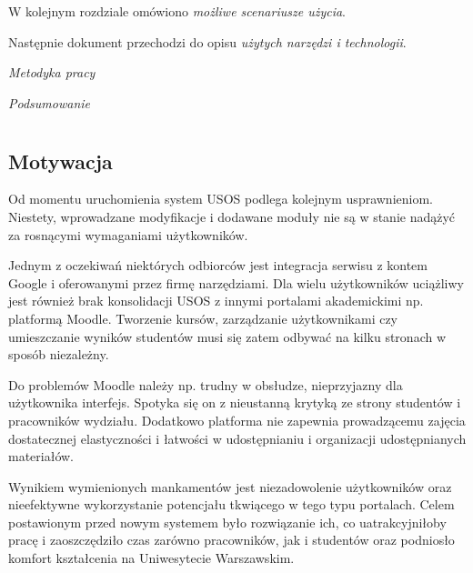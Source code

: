 \documentclass{pracamgr}
\begin{document}
W kolejnym rozdziale omówiono \emph{możliwe scenariusze użycia}. 

Następnie dokument przechodzi do opisu \emph{użytych narzędzi i technologii}. 

\emph{Metodyka pracy} 

\emph{Podsumowanie}

%
%
\chapter{ } %

%
%
\section{Motywacja}

Od momentu uruchomienia system USOS podlega kolejnym usprawnieniom. Niestety, 
wprowadzane modyfikacje i dodawane moduły nie są w stanie nadążyć za rosnącymi 
wymaganiami użytkowników.
 
Jednym z oczekiwań niektórych odbiorców jest integracja serwisu z kontem Google i 
oferowanymi przez firmę narzędziami. Dla wielu użytkowników uciążliwy jest również 
brak konsolidacji USOS z innymi portalami akademickimi np. platformą Moodle. 
Tworzenie kursów, zarządzanie użytkownikami czy umieszczanie wyników studentów
musi się zatem odbywać na kilku stronach w sposób niezależny.

Do problemów Moodle należy np. trudny w obsłudze, nieprzyjazny dla użytkownika 
interfejs. Spotyka się on z nieustanną krytyką ze strony studentów i pracowników 
wydziału. Dodatkowo platforma nie zapewnia prowadzącemu zajęcia dostatecznej 
elastyczności i łatwości w udostępnianiu i organizacji udostępnianych materiałów. 
	
Wynikiem wymienionych mankamentów jest niezadowolenie użytkowników oraz 
nieefektywne wykorzystanie potencjału tkwiącego w tego typu portalach. Celem 
postawionym przed nowym systemem było rozwiązanie ich, co uatrakcyjniłoby pracę 
i zaoszczędziło czas zarówno pracowników, jak i studentów oraz podniosło komfort 
kształcenia na Uniwesytecie Warszawskim.

%
%
\end{document}
